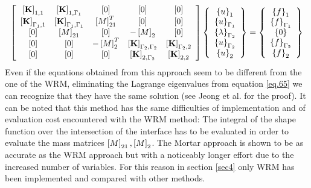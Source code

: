 \begin{equation}
\label{eq.65}
 \left[ \begin{array}{ccccc} 
    \left[{\mathbf{K}}\right]_{1,1} & \left[{\mathbf{K}}\right]_{1,\Gamma_1} &\left[{0}\right] &\left[{0}\right]& \left[{0}\right] \\
   \left[{\mathbf{K}}\right]_{\Gamma_1,1} & \left[{\mathbf{K}}\right]_{\Gamma_1,\Gamma_1} &\left[{M}\right]_{21}^T & \left[{0}\right]& \left[{0}\right]\\ \left[{0}\right] &\left[{M}\right]_{21} &\left[{0}\right] &-\left[{M}\right]_{2}& \left[{0}\right]\\\left[{0}\right]& \left[{0}\right]& -\left[{M}\right]_{2}^T & \left[{\mathbf{K}}\right]_{\Gamma_2,\Gamma_2} &\left[{\mathbf{K}}\right]_{\Gamma_2,2}\\   
    \left[{0}\right] & \left[{0}\right]&\left[{0}\right]& \left[{\mathbf{K}}\right]_{2,\Gamma_2} & \left[{\mathbf{K}}\right]_{2,2}\end{array} \right]\left\lbrace\begin{array}{c} \left\lbrace{u}\right \rbrace_1\\\left\lbrace{u}\right \rbrace_{\Gamma_1}\\\left\lbrace{\lambda}\right \rbrace_{\Gamma_2}\\\left\lbrace{u}\right \rbrace_{\Gamma_2}\\\left\lbrace{u}\right \rbrace_2
    \end{array}\right\rbrace=\left\lbrace\begin{array}{c} \left\lbrace{f}\right \rbrace_1\\\left\lbrace{f}\right \rbrace_{\Gamma_1}\\\left\lbrace{0}\right \rbrace\\\left\lbrace{f}\right \rbrace_{\Gamma_2}\\\left\lbrace{f}\right \rbrace_2
    \end{array}\right\rbrace
\end{equation}
Even if the equations obtained from this approach seem to be different from the one of the WRM, eliminating the Lagrange eigenvalues from equation \eqref{eq.65} we can recognize that they have the same solution (see Jeong et al. \cite{jeong2017element} for the proof). It can be noted that this method has the same difficulties of implementation and of evaluation cost encountered with the WRM method: The integral of the shape function over the intersection of the interface has to be evaluated in order to evaluate the mass matrices $\left[{M}\right]_{21},\left[{M}\right]_{2}$. The Mortar approach is shown to be as accurate as the WRM approach but with a noticeably longer effort due to the increased number of variables. For this reason in section \ref{sec4} only WRM has been implemented and compared with other methods.
